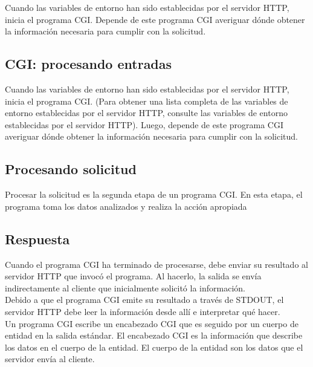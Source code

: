 \documentclass{article}
\begin{document}
Cuando las variables de entorno han sido establecidas por el servidor HTTP, inicia el programa CGI. Depende de este programa CGI averiguar dónde obtener la información necesaria para cumplir con la solicitud.\\


\subsection{CGI: procesando entradas}
Cuando las variables de entorno han sido establecidas por el servidor HTTP, inicia el programa CGI. (Para obtener una lista completa de las variables de entorno establecidas por el servidor HTTP, consulte las variables de entorno establecidas por el servidor HTTP). Luego, depende de este programa CGI averiguar dónde obtener la información necesaria para cumplir con la solicitud.\\

\subsection{Procesando solicitud}
Procesar la solicitud es la segunda etapa de un programa CGI. En esta etapa, el programa toma los datos analizados y realiza la acción apropiada

\subsection{Respuesta}
Cuando el programa CGI ha terminado de procesarse, debe enviar su resultado al servidor HTTP que invocó el programa. Al hacerlo, la salida se envía indirectamente al cliente que inicialmente solicitó la información.\\

Debido a que el programa CGI emite su resultado a través de STDOUT, el servidor HTTP debe leer la información desde allí e interpretar qué hacer.\\

Un programa CGI escribe un encabezado CGI que es seguido por un cuerpo de entidad en la salida estándar. El encabezado CGI es la información que describe los datos en el cuerpo de la entidad. El cuerpo de la entidad son los datos que el servidor envía al cliente.\\
\end{document}
